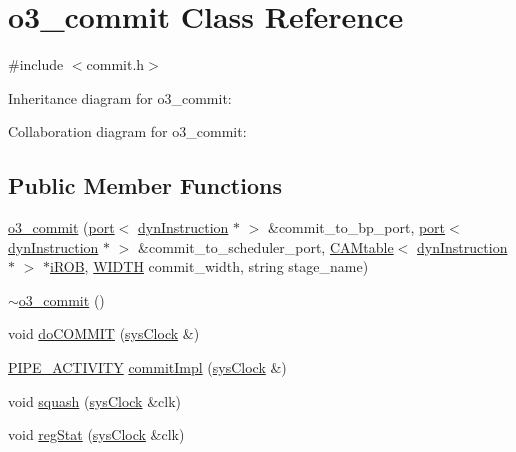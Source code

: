 \hypertarget{classo3__commit}{
\section{o3\_\-commit Class Reference}
\label{classo3__commit}
}


{\ttfamily \#include $<$commit.h$>$}



Inheritance diagram for o3\_\-commit:


Collaboration diagram for o3\_\-commit:
\subsection*{Public Member Functions}
\begin{DoxyCompactItemize}
\item 
\hyperlink{classo3__commit_ad39c647c50b97d4243d30a94a73855c7}{o3\_\-commit} (\hyperlink{classport}{port}$<$ \hyperlink{classdynInstruction}{dynInstruction} $\ast$ $>$ \&commit\_\-to\_\-bp\_\-port, \hyperlink{classport}{port}$<$ \hyperlink{classdynInstruction}{dynInstruction} $\ast$ $>$ \&commit\_\-to\_\-scheduler\_\-port, \hyperlink{classCAMtable}{CAMtable}$<$ \hyperlink{classdynInstruction}{dynInstruction} $\ast$ $>$ $\ast$\hyperlink{backend_2parser_8cpp_ad73ae25f81e6e99482f3fbd5ba9664ce}{iROB}, \hyperlink{global_2global_8h_a6fa2e24b8a418fa215e183264cbea3aa}{WIDTH} commit\_\-width, string stage\_\-name)
\item 
\hyperlink{classo3__commit_a9ececc230499566621371fab58aae228}{$\sim$o3\_\-commit} ()
\item 
void \hyperlink{classo3__commit_a54270cad3a81c7cce6f418517a927b98}{doCOMMIT} (\hyperlink{classsysClock}{sysClock} \&)
\item 
\hyperlink{unit_2stage_8h_ab00e4188e8b8974fecb1dfd12764cbb1}{PIPE\_\-ACTIVITY} \hyperlink{classo3__commit_a87f66e559f7376364630df8b3907e8cd}{commitImpl} (\hyperlink{classsysClock}{sysClock} \&)
\item 
void \hyperlink{classo3__commit_a12cc9b965c48bdf58ede84426c78287b}{squash} (\hyperlink{classsysClock}{sysClock} \&clk)
\item 
void \hyperlink{classo3__commit_a32f24b682cb40b48ac43bcbeb1c8b67d}{regStat} (\hyperlink{classsysClock}{sysClock} \&clk)
\end{DoxyCompactItemize}


